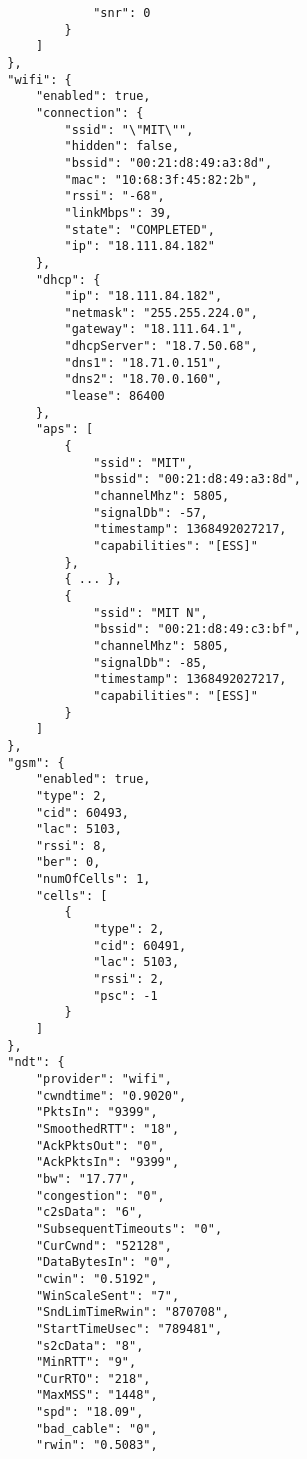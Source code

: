 \begin{verbatim}
                    "snr": 0
                }
            ]
        },
        "wifi": {
            "enabled": true,
            "connection": {
                "ssid": "\"MIT\"",
                "hidden": false,
                "bssid": "00:21:d8:49:a3:8d",
                "mac": "10:68:3f:45:82:2b",
                "rssi": "-68",
                "linkMbps": 39,
                "state": "COMPLETED",
                "ip": "18.111.84.182"
            },
            "dhcp": {
                "ip": "18.111.84.182",
                "netmask": "255.255.224.0",
                "gateway": "18.111.64.1",
                "dhcpServer": "18.7.50.68",
                "dns1": "18.71.0.151",
                "dns2": "18.70.0.160",
                "lease": 86400
            },
            "aps": [
                {
                    "ssid": "MIT",
                    "bssid": "00:21:d8:49:a3:8d",
                    "channelMhz": 5805,
                    "signalDb": -57,
                    "timestamp": 1368492027217,
                    "capabilities": "[ESS]"
                },
                { ... },
                {
                    "ssid": "MIT N",
                    "bssid": "00:21:d8:49:c3:bf",
                    "channelMhz": 5805,
                    "signalDb": -85,
                    "timestamp": 1368492027217,
                    "capabilities": "[ESS]"
                }
            ]
        },
        "gsm": {
            "enabled": true,
            "type": 2,
            "cid": 60493,
            "lac": 5103,
            "rssi": 8,
            "ber": 0,
            "numOfCells": 1,
            "cells": [
                {
                    "type": 2,
                    "cid": 60491,
                    "lac": 5103,
                    "rssi": 2,
                    "psc": -1
                }
            ]
        },
        "ndt": {
            "provider": "wifi",
            "cwndtime": "0.9020",
            "PktsIn": "9399",
            "SmoothedRTT": "18",
            "AckPktsOut": "0",
            "AckPktsIn": "9399",
            "bw": "17.77",
            "congestion": "0",
            "c2sData": "6",
            "SubsequentTimeouts": "0",
            "CurCwnd": "52128",
            "DataBytesIn": "0",
            "cwin": "0.5192",
            "WinScaleSent": "7",
            "SndLimTimeRwin": "870708",
            "StartTimeUsec": "789481",
            "s2cData": "8",
            "MinRTT": "9",
            "CurRTO": "218",
            "MaxMSS": "1448",
            "spd": "18.09",
            "bad_cable": "0",
            "rwin": "0.5083",

\end{verbatim}
